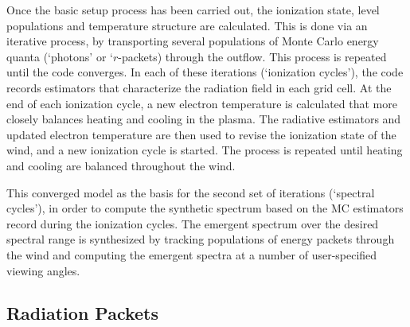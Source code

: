 Once the basic setup process has been carried out, the ionization state,
level populations and temperature structure are calculated.
This is done via an iterative process, by transporting several populations of 
Monte Carlo energy quanta (`photons' or `$r$-packets) through the outflow.
This process is repeated until the code converges. 
In each of these iterations (`ionization cycles'), the code records estimators that 
characterize the radiation field in each grid cell. At the end 
of each ionization cycle, a new electron temperature is calculated
that more closely balances heating and cooling in the 
plasma. The radiative estimators and updated electron
temperature are then used to revise the ionization state of the wind,
and a new ionization cycle is started. The process is repeated until
heating and cooling are balanced throughout the wind. 

This converged model as the basis for the second set of
iterations (`spectral cycles'), in order to compute the synthetic spectrum based on the 
MC estimators record during the ionization cycles. 
The emergent spectrum over the desired spectral range is synthesized by 
tracking populations of energy packets through the wind and computing the emergent spectra at
a number of user-specified viewing angles.  

\subsection{Radiation Packets}


